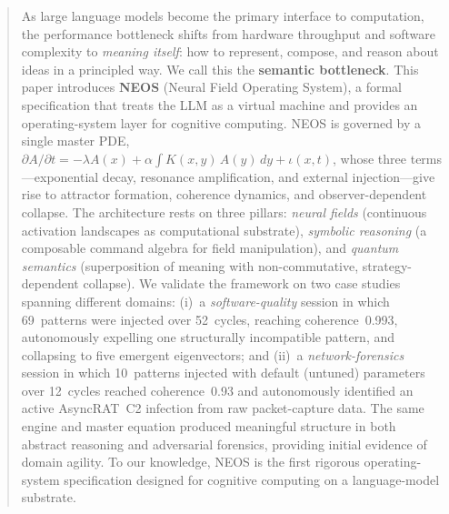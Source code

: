 \begin{abstract}
As large language models become the primary interface to computation,
the performance bottleneck shifts from hardware throughput and software
complexity to \emph{meaning itself}: how to represent, compose, and
reason about ideas in a principled way.  We call this the
\textbf{semantic bottleneck}.  This paper introduces \textbf{NEOS}
(Neural Field Operating System), a formal specification that treats the
LLM as a virtual machine and provides an operating-system layer for
cognitive computing.  NEOS is governed by a single master PDE,
$\partial A/\partial t = -\lambda A(x)
  + \alpha\!\int\!K(x,y)\,A(y)\,dy + \iota(x,t)$,
whose three terms---exponential decay, resonance amplification, and
external injection---give rise to attractor formation, coherence
dynamics, and observer-dependent collapse.  The architecture rests on
three pillars: \emph{neural fields} (continuous activation landscapes
as computational substrate), \emph{symbolic reasoning} (a composable
command algebra for field manipulation), and \emph{quantum semantics}
(superposition of meaning with non-commutative, strategy-dependent
collapse).  We validate the framework on two case studies spanning different
domains: (i)~a \emph{software-quality} session in which 69~patterns
were injected over 52~cycles, reaching coherence~0.993, autonomously
expelling one structurally incompatible pattern, and collapsing to five
emergent eigenvectors; and (ii)~a \emph{network-forensics} session in
which 10~patterns injected with default (untuned) parameters over
12~cycles reached coherence~0.93 and autonomously identified an active
AsyncRAT~C2 infection from raw packet-capture data.  The same engine
and master equation produced meaningful structure in both abstract
reasoning and adversarial forensics, providing initial evidence of
domain agility.  To our knowledge, NEOS is the first rigorous
operating-system specification designed for cognitive computing on a
language-model substrate.
\end{abstract}
